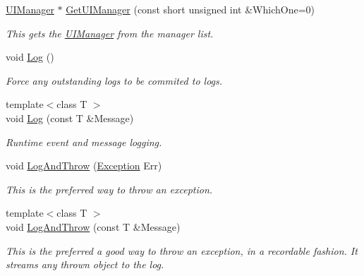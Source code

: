 \begin{DoxyCompactItemize}
\hyperlink{classMezzanine_1_1UIManager}{UIManager} $\ast$ \hyperlink{classMezzanine_1_1World_ad23a75672aa43a6cc30521b36595b345}{GetUIManager} (const short unsigned int \&WhichOne=0)
\begin{DoxyCompactList}\small\item\em This gets the \hyperlink{classMezzanine_1_1UIManager}{UIManager} from the manager list. \item\end{DoxyCompactList}\item 
\hypertarget{classMezzanine_1_1World_a9ed5778835837933cf1ad9c04518732a}{
void \hyperlink{classMezzanine_1_1World_a9ed5778835837933cf1ad9c04518732a}{Log} ()}
\label{classMezzanine_1_1World_a9ed5778835837933cf1ad9c04518732a}

\begin{DoxyCompactList}\small\item\em Force any outstanding logs to be commited to logs. \item\end{DoxyCompactList}\item 
{\footnotesize template$<$class T $>$ }\\void \hyperlink{classMezzanine_1_1World_a693eea2a435e55618283e94f4cbaba64}{Log} (const T \&Message)
\begin{DoxyCompactList}\small\item\em Runtime event and message logging. \item\end{DoxyCompactList}\item 
void \hyperlink{classMezzanine_1_1World_a93405caf197f9324f3620ecefa1efc77}{LogAndThrow} (\hyperlink{classMezzanine_1_1Exception}{Exception} Err)
\begin{DoxyCompactList}\small\item\em This is the preferred way to throw an exception. \item\end{DoxyCompactList}\item 
{\footnotesize template$<$class T $>$ }\\void \hyperlink{classMezzanine_1_1World_ab0ddaf91f518f7d3f6044b03936e9ea4}{LogAndThrow} (const T \&Message)
\begin{DoxyCompactList}\small\item\em This is the preferred a good way to throw an exception, in a recordable fashion. It streams any thrown object to the log. \item\end{DoxyCompactList}\item 

\end{DoxyCompactItemize}
